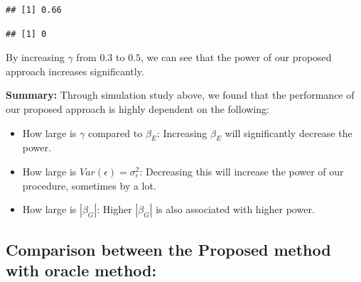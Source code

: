 \documentclass[
]{article}
\newenvironment{Shaded}{\begin{snugshade}}{\end{snugshade}}
\newcommand{\CommentTok}[1]{\textcolor[rgb]{0.56,0.35,0.01}{\textit{#1}}}
\newcommand{\DataTypeTok}[1]{\textcolor[rgb]{0.13,0.29,0.53}{#1}}
\newcommand{\DecValTok}[1]{\textcolor[rgb]{0.00,0.00,0.81}{#1}}
\newcommand{\KeywordTok}[1]{\textcolor[rgb]{0.13,0.29,0.53}{\textbf{#1}}}
\newcommand{\NormalTok}[1]{#1}
\newcommand{\OperatorTok}[1]{\textcolor[rgb]{0.81,0.36,0.00}{\textbf{#1}}}
\newcommand{\StringTok}[1]{\textcolor[rgb]{0.31,0.60,0.02}{#1}}
\providecommand{\tightlist}{%
  \setlength{\itemsep}{0pt}\setlength{\parskip}{0pt}}
\begin{document}
\begin{verbatim}
## [1] 0.66
\end{verbatim}

\begin{Shaded}
\end{Shaded}

\begin{verbatim}
## [1] 0
\end{verbatim}

By increasing \(\gamma\) from \(0.3\) to \(0.5\), we can see that the
power of our proposed approach increases significantly.

\textbf{Summary:} Through simulation study above, we found that the
performance of our proposed approach is highly dependent on the
following:

\begin{itemize}
\tightlist
\item
  How large is \(\gamma\) compared to \(\beta_E\): Increasing
  \(\beta_E\) will significantly decrease the power.
\item
  How large is \(Var(\epsilon)= \sigma^2_\epsilon\): Decreasing this
  will increase the power of our procedure, sometimes by a lot.
\item
  How large is \(|\beta_G|\): Higher \(|\beta_G|\) is also associated
  with higher power.
\end{itemize}

\clearpage

\hypertarget{comparison-between-the-proposed-method-with-oracle-method}{%
\subsection{Comparison between the Proposed method with oracle
method:}\label{comparison-between-the-proposed-method-with-oracle-method}}
\end{document}

